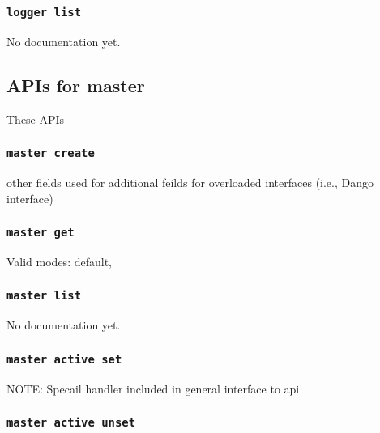 \subsubsection{\lstinline[basicstyle=\Large\ttfamily]$logger list$}

{No documentation yet.}
\subsection{APIs for master}

\par
These APIs

\subsubsection{\lstinline[basicstyle=\Large\ttfamily]$master create$}

{other fields used for additional feilds for overloaded interfaces
(i.e., Dango interface)}
\subsubsection{\lstinline[basicstyle=\Large\ttfamily]$master get$}

{Valid modes: {default, }}
\subsubsection{\lstinline[basicstyle=\Large\ttfamily]$master list$}

{No documentation yet.}
\subsubsection{\lstinline[basicstyle=\Large\ttfamily]$master active set$}

{NOTE: Specail handler included in general interface to api}
\subsubsection{\lstinline[basicstyle=\Large\ttfamily]$master active unset$}

